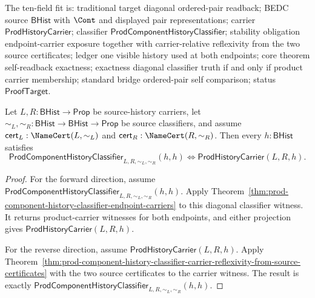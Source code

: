 \begin{theorem}
\label{thm:prod-component-history-classifier-self-readback-exactness}
The ten-field fit is: traditional target diagonal ordered-pair readback; BEDC
source $\mathsf{BHist}$ with $\Cont$ and displayed pair representations;
carrier $\mathsf{ProdHistoryCarrier}$; classifier
$\mathsf{ProdComponentHistoryClassifier}$; stability obligation endpoint-carrier
exposure together with carrier-relative reflexivity from the two source
certificates; ledger one visible history used at both endpoints; core theorem
self-readback exactness; exactness diagonal classifier truth if and only if
product carrier membership; standard bridge ordered-pair self comparison;
status $\mathsf{ProofTarget}$.

Let $L,R:\mathsf{BHist}\to\mathsf{Prop}$ be source-history carriers, let
$\sim_L,\sim_R:\mathsf{BHist}\to\mathsf{BHist}\to\mathsf{Prop}$ be source
classifiers, and assume $\mathsf{cert}_L:\NameCert(L,\sim_L)$ and
$\mathsf{cert}_R:\NameCert(R,\sim_R)$. Then every $h:\mathsf{BHist}$
satisfies
$$
\mathsf{ProdComponentHistoryClassifier}_{L,R,\sim_L,\sim_R}(h,h)
\Longleftrightarrow
\mathsf{ProdHistoryCarrier}(L,R,h).
$$
\end{theorem}
\begin{proof}
For the forward direction, assume
$\mathsf{ProdComponentHistoryClassifier}_{L,R,\sim_L,\sim_R}(h,h)$. Apply
Theorem~\ref{thm:prod-component-history-classifier-endpoint-carriers} to this
diagonal classifier witness. It returns product-carrier witnesses for both
endpoints, and either projection gives $\mathsf{ProdHistoryCarrier}(L,R,h)$.

For the reverse direction, assume $\mathsf{ProdHistoryCarrier}(L,R,h)$. Apply
Theorem~\ref{thm:prod-component-history-classifier-carrier-reflexivity-from-source-certificates}
with the two source certificates to the carrier witness. The result is exactly
$\mathsf{ProdComponentHistoryClassifier}_{L,R,\sim_L,\sim_R}(h,h)$.
\end{proof}

